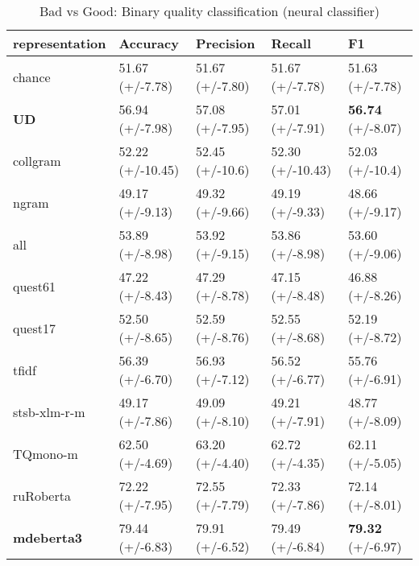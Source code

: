 \begin{table}[H]
	\centering
	\begin{tabular}{l|llll}
		\toprule
		representation & Accuracy         & Precision        & Recall           & F1               \\
		\midrule
		chance          & 51.67 (+/-7.78)  & 51.67 (+/-7.80)  & 51.67 (+/-7.78)  & 51.63 (+/-7.78)  \\
		\midrule
		\textbf{UD}              & 56.94 (+/-7.98)  & 57.08 (+/-7.95)  & 57.01 (+/-7.91)  & \textbf{56.74} (+/-8.07)  \\
		collgram        & 52.22 (+/-10.45) & 52.45 (+/-10.6) & 52.30 (+/-10.43) & 52.03 (+/-10.4) \\
		ngram           & 49.17 (+/-9.13)  & 49.32 (+/-9.66)  & 49.19 (+/-9.33)  & 48.66 (+/-9.17)  \\
		all             & 53.89 (+/-8.98)  & 53.92 (+/-9.15)  & 53.86 (+/-8.98)  & 53.60 (+/-9.06)  \\
		\midrule
		quest61 		& 47.22 (+/-8.43) & 47.29 (+/-8.78) & 47.15 (+/-8.48) & 46.88 (+/-8.26)  \\
		quest17         & 52.50 (+/-8.65)  & 52.59 (+/-8.76)  & 52.55 (+/-8.68)  & 52.19 (+/-8.72)  \\
		\midrule
		tfidf           & 56.39 (+/-6.70)  & 56.93 (+/-7.12)  & 56.52 (+/-6.77)  & 55.76 (+/-6.91)  \\
		\midrule
		stsb-xlm-r-m          & 49.17 (+/-7.86)  & 49.09 (+/-8.10)  & 49.21 (+/-7.91)  & 48.77 (+/-8.09)  \\
		TQmono-m        & 62.50 (+/-4.69)  & 63.20 (+/-4.40)  & 62.72 (+/-4.35)  & 62.11 (+/-5.05)  \\
		ruRoberta & 72.22 (+/-7.95)  & 72.55 (+/-7.79)  & 72.33 (+/-7.86)  & 72.14 (+/-8.01)  \\
		\textbf{mdeberta3}  & 79.44 (+/-6.83)  & 79.91 (+/-6.52)  & 79.49 (+/-6.84)  & \boxit{0.4in} \textbf{79.32} (+/-6.97) \\
		\bottomrule
	\end{tabular}
\caption{\label{tab:bad-good_neu}Bad vs Good: Binary quality classification (neural classifier)}
\end{table}

